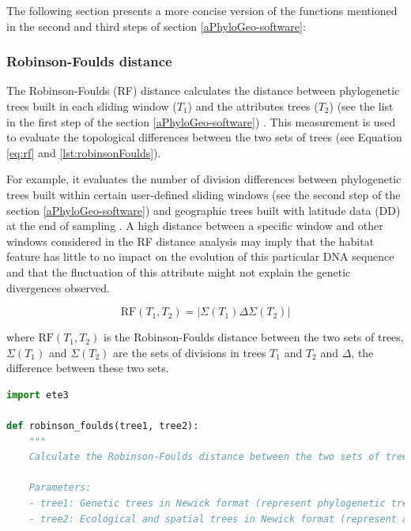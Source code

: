 {The following section presents a more concise version of the functions mentioned in the second and third steps of section \autoref{aPhyloGeo-software}:

\subsubsection{Robinson-Foulds distance}\label{RF}
The Robinson-Foulds (RF) distance calculates the distance between phylogenetic trees built in each sliding window ($T_1$) and the attributes trees ($T_2$) (see the list in the first step of the section \autoref{aPhyloGeo-software}) \citep{tahiri2018new, koshkarov_phylogeography_2022}. This measurement is used to evaluate the topological differences between the two sets of trees (see Equation \eqref{eq:rf} and \autoref{lst:robinsonFoulds}).

For example, it evaluates the number of division differences between phylogenetic trees built within certain user-defined sliding windows (see the second step of the section \autoref{aPhyloGeo-software}) and geographic trees built with latitude data (DD) at the end of sampling \citep{robinson_comparison_1981}. A high distance between a specific window and other windows considered in the RF distance analysis may imply that the habitat feature has little to no impact on the evolution of this particular DNA sequence and that the fluctuation of this attribute might not explain the genetic divergences observed.

\begin{equation}\label{eq:rf}
    \text{RF}(T_1, T_2) = | \Sigma(T_1) \Delta \Sigma(T_2) |
\end{equation}

where $\text{RF}(T_1, T_2)$ is the Robinson-Foulds distance between the two sets of trees, $\Sigma(T_1)$ and $\Sigma(T_2)$ are the sets of divisions in trees $T_1$ and $T_2$ and $ \Delta $, the difference between these two sets.

\begin{lstlisting}[label=lst:robinsonFoulds,language=Python,caption=Python script for calculating the Robinson-Foulds Distance using the ete3 package in the aPhyloGeo package.]
import ete3

def robinson_foulds(tree1, tree2):
    """
    Calculate the Robinson-Foulds distance between the two sets of trees.

    Parameters:
    - tree1: Genetic trees in Newick format (represent phylogenetic trees in text form).
    - tree2: Ecological and spatial trees in Newick format (represent attributes trees in text form).


\end{lstlisting}}
